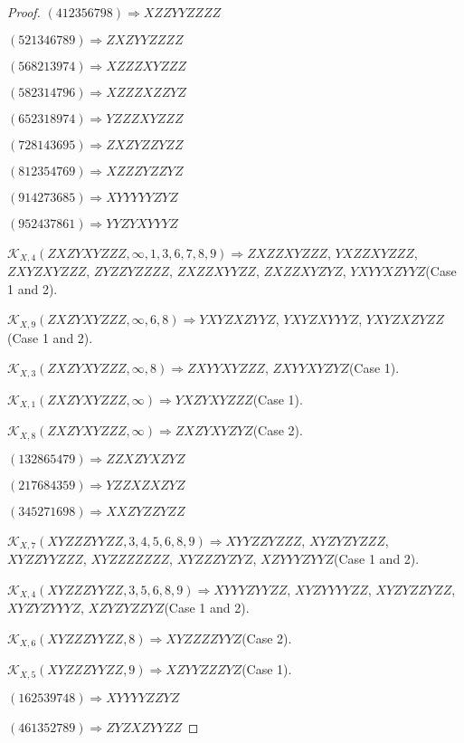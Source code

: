 \documentclass[12pt]{article}
\theoremstyle{plain}
\theoremstyle{definition}
\theoremstyle{remark}
\newcommand{\fancy}[1]{\mathcal{#1}}
\def\K{\fancy{K}}
\begin{document}
\begin{proof}
	$(4 1 2 3 5 6 7 9 8)\Rightarrow XZZYYZZZZ$
	
	$(5 2 1 3 4 6 7 8 9)\Rightarrow ZXZYYZZZZ$
	
	$(5 6 8 2 1 3 9 7 4)\Rightarrow XZZZXYZZZ$
	
	$(5 8 2 3 1 4 7 9 6)\Rightarrow XZZZXZZYZ$
	
	$(6 5 2 3 1 8 9 7 4)\Rightarrow YZZZXYZZZ$
	
	$(7 2 8 1 4 3 6 9 5)\Rightarrow ZXZYZZYZZ$
	
	$(8 1 2 3 5 4 7 6 9)\Rightarrow XZZZYZZYZ$
	
	$(9 1 4 2 7 3 6 8 5)\Rightarrow XYYYYYZYZ$
	
	$(9 5 2 4 3 7 8 6 1)\Rightarrow YYZYXYYYZ$
	
	
	
	$\K_{X,4}(ZXZYXYZZZ,\infty,1, 3, 6, 7, 8, 9)\Rightarrow $$ZXZZXYZZZ$, $YXZZXYZZZ$, $ZXYZXYZZZ$, $ZYZZYZZZZ$, $ZXZZXYYZZ$, $ZXZZXYZYZ$, $YXYYXZYYZ$(Case 1 and 2).
	
	$\K_{X,9}(ZXZYXYZZZ,\infty,6, 8)\Rightarrow $$YXYZXZYYZ$, $YXYZXYYYZ$, $YXYZXZYZZ$(Case 1 and 2).
	
	$\K_{X,3}(ZXZYXYZZZ,\infty,8)\Rightarrow $$ZXYYXYZZZ$, $ZXYYXYZYZ$(Case 1).
	
	$\K_{X,1}(ZXZYXYZZZ,\infty)\Rightarrow $$YXZYXYZZZ$(Case 1).
	
	$\K_{X,8}(ZXZYXYZZZ,\infty)\Rightarrow $$ZXZYXYZYZ$(Case 2).
	
	
	
	$(1 3 2 8 6 5 4 7 9)\Rightarrow ZZXZYXZYZ$
	
	$(2 1 7 6 8 4 3 5 9)\Rightarrow YZZXZXZYZ$
	
	$(3 4 5 2 7 1 6 9 8)\Rightarrow XXZYZZYZZ$
	
	
	
	$\K_{X,7}(XYZZZYYZZ,3, 4, 5, 6, 8, 9)\Rightarrow $$XYYZZYZZZ$, $XYZYZYZZZ$, $XYZZYYZZZ$, $XYZZZZZZZ$, $XYZZZYZYZ$, $XZYYYZYYZ$(Case 1 and 2).
	
	$\K_{X,4}(XYZZZYYZZ,3, 5, 6, 8, 9)\Rightarrow $$XYYYZYYZZ$, $XYZYYYYZZ$, $XYZYZZYZZ$, $XYZYZYYYZ$, $XZYZYZZYZ$(Case 1 and 2).
	
	$\K_{X,6}(XYZZZYYZZ,8)\Rightarrow $$XYZZZZYYZ$(Case 2).
	
	$\K_{X,5}(XYZZZYYZZ,9)\Rightarrow $$XZYYZZZYZ$(Case 1).
	
	
	
	$(1 6 2 5 3 9 7 4 8)\Rightarrow XYYYYZZYZ$
	
	$(4 6 1 3 5 2 7 8 9)\Rightarrow ZYZXZYYZZ$
	

\end{proof}
\end{document}
